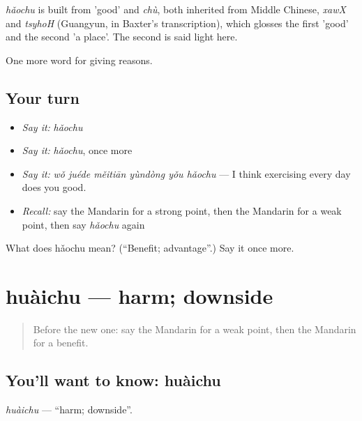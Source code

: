 \begin{cousinweb}
\emph{hǎochu} is built from  'good' and \emph{chù}, both inherited from Middle Chinese, \emph{xawX} and \emph{tsyhoH} (Guangyun, in Baxter's transcription), which glosses the first 'good' and the second 'a place'. The second is said light here.
\end{cousinweb}

\begin{grammarlens}[title={What you've built}]
One more word for giving reasons.
\end{grammarlens}

\subsection*{Your turn}
\begin{itemize}
\raggedright
  \item \emph{Say it:} \emph{hǎochu}
  \item \emph{Say it:} \emph{hǎochu}, once more
  \item \emph{Say it:} \emph{wǒ juéde měitiān yùndòng yǒu hǎochu} — I think exercising every day does you good.
  \item \emph{Recall:} say the Mandarin for a strong point, then the Mandarin for a weak point, then say \emph{hǎochu} again
\end{itemize}

\begin{tcolorbox}[breakable,colback=teal!4,colframe=teal!35!black,title={Before you move on}]
What does hǎochu mean? (\textquotedblleft{}Benefit; advantage\textquotedblright{}.) Say it once more.
\end{tcolorbox}
\section[huàichu]{huàichu — harm; downside}

\label{lesson:ZH-C373-huaichu}



\begin{quote}
Before the new one: say the Mandarin for a weak point, then the Mandarin for a benefit.
\end{quote}

\subsection*{You'll want to know: huàichu}
\emph{huàichu} — \textquotedblleft{}harm; downside\textquotedblright{}.

